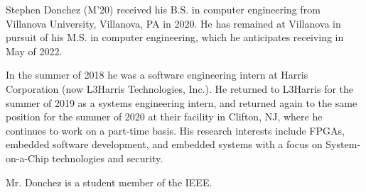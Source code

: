 \begin{IEEEbiography}
	{Stephen Donchez}
(M'20) received his B.S. in
computer engineering from Villanova University, Villanova, PA in 2020. He has remained
at Villanova in pursuit of his M.S. in computer engineering, which he anticipates
receiving in May of 2022.

In the summer of 2018 he was a software engineering intern at Harris Corporation  
(now L3Harris Technologies, Inc.). He returned to L3Harris for the summer of 2019 as a 
systems engineering intern, and returned again to the same position for the summer
of 2020 at their facility in Clifton, NJ, where he continues to work on a part-time basis.
His research interests include FPGAs, embedded software development, and embedded systems 
with a focus on System-on-a-Chip technologies and security.

Mr. Donchez is a student member of the IEEE.
\end{IEEEbiography}
